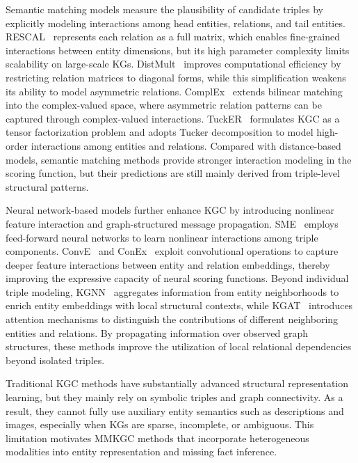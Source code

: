 \documentclass[pdflatex,sn-mathphys-num]{sn-jnl}
\begin{document}
Semantic matching models measure the plausibility of candidate triples by explicitly modeling interactions among head entities, relations, and tail entities. RESCAL~\cite{nickel2011rescal} represents each relation as a full matrix, which enables fine-grained interactions between entity dimensions, but its high parameter complexity limits scalability on large-scale KGs. DistMult~\cite{yang2015distmult} improves computational efficiency by restricting relation matrices to diagonal forms, while this simplification weakens its ability to model asymmetric relations. ComplEx~\cite{trouillon2016complex} extends bilinear matching into the complex-valued space, where asymmetric relation patterns can be captured through complex-valued interactions. TuckER~\cite{balazevic2019tucker} formulates KGC as a tensor factorization problem and adopts Tucker decomposition to model high-order interactions among entities and relations. Compared with distance-based models, semantic matching methods provide stronger interaction modeling in the scoring function, but their predictions are still mainly derived from triple-level structural patterns.

Neural network-based models further enhance KGC by introducing nonlinear feature interaction and graph-structured message propagation. SME~\cite{bordes2014sme} employs feed-forward neural networks to learn nonlinear interactions among triple components. ConvE~\cite{dettmers2018conve} and ConEx~\cite{demir2021conex} exploit convolutional operations to capture deeper feature interactions between entity and relation embeddings, thereby improving the expressive capacity of neural scoring functions. Beyond individual triple modeling, KGNN~\cite{wang2019kgnn} aggregates information from entity neighborhoods to enrich entity embeddings with local structural contexts, while KGAT~\cite{wang2019kgat} introduces attention mechanisms to distinguish the contributions of different neighboring entities and relations. By propagating information over observed graph structures, these methods improve the utilization of local relational dependencies beyond isolated triples.

Traditional KGC methods have substantially advanced structural representation learning, but they mainly rely on symbolic triples and graph connectivity. As a result, they cannot fully use auxiliary entity semantics such as descriptions and images, especially when KGs are sparse, incomplete, or ambiguous. This limitation motivates MMKGC methods that incorporate heterogeneous modalities into entity representation and missing fact inference.
\end{document}
